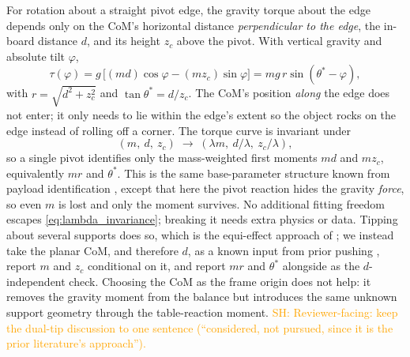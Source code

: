 \documentclass[10pt, conference]{IEEEtran}
\newcommand{\sh}[1]{\textcolor{orange}{SH: #1}}
\begin{document}
For rotation about a straight pivot edge, the gravity torque about the edge depends only on the CoM's horizontal distance \emph{perpendicular to the edge}, the in-board distance $d$, and its height $z_c$ above the pivot. With vertical gravity and absolute tilt $\varphi$,
\begin{equation}
    \tau(\varphi) = g\,\big[(m d)\cos\varphi - (m z_c)\sin\varphi\big] = mg\,r\sin(\theta^{*} - \varphi),
    \label{eq:tau_model}
\end{equation}
with $r = \sqrt{d^2 + z_c^2}$ and $\tan\theta^{*} = d/z_c$. The CoM's position \emph{along} the edge does not enter; it only needs to lie within the edge's extent so the object rocks on the edge instead of rolling off a corner. The torque curve is invariant under
\begin{equation}
    (m,\ d,\ z_c) \;\to\; (\lambda m,\ d/\lambda,\ z_c/\lambda),
    \label{eq:lambda_invariance}
\end{equation}
so a single pivot identifies only the mass-weighted first moments $m d$ and $m z_c$, equivalently $m r$ and $\theta^{*}$. This is the same base-parameter structure known from payload identification \cite{atkeson_rigid_1985}, except that here the pivot reaction hides the gravity \emph{force}, so even $m$ is lost and only the moment survives. No additional fitting freedom escapes \eqref{eq:lambda_invariance}; breaking it needs extra physics or data. Tipping about several supports does so, which is the equi-effect approach of \cite{yong_yu_estimation_1999}; we instead take the planar CoM, and therefore $d$, as a known input from prior pushing \cite{hyland_predicting_2023}, report $m$ and $z_c$ conditional on it, and report $m r$ and $\theta^{*}$ alongside as the $d$-independent check. Choosing the CoM as the frame origin does not help: it removes the gravity moment from the balance but introduces the same unknown support geometry through the table-reaction moment. \sh{Reviewer-facing: keep the dual-tip discussion to one sentence (``considered, not pursued, since it is the prior literature's approach'').}
\end{document}
